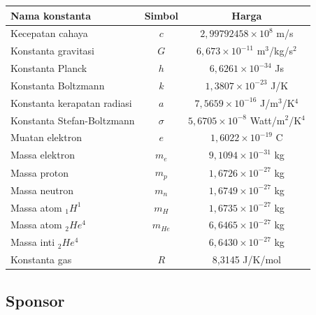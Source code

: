 \documentclass[11pt,fleqn, a4paper]{exam}
\begin{document}
\begin{table}[ht]
\centering
\label{tab:konstanta03}
\renewcommand{\arraystretch}{1.4}
\begin{tabular}{|l|c|c|}
\hline
\textbf{Nama konstanta} & \textbf{Simbol} & \textbf{Harga}\\
\hline
\hline
Kecepatan cahaya & $c$ & $2,99792458 \times 10^{8}$ m/s\\
\hline
Konstanta gravitasi & $G$ & $6,673 \times 10^{-11}$ m$^{3}$/kg/s$^{2}$\\
\hline
Konstanta Planck & $h$ & $6,6261 \times 10^{-34}$ Js\\
\hline
Konstanta Boltzmann & $k$ & $1,3807 \times 10^{-23}$ J/K\\
\hline
Konstanta kerapatan radiasi & $a$ & $7,5659 \times 10^{-16}$ J/m$^3$/K$^4$\\
\hline
Konstanta Stefan-Boltzmann & $\sigma$ & $5,6705 \times 10^{-8}$ Watt/m$^2$/K$^4$\\
\hline
Muatan elektron & $e$ & $1,6022 \times 10^{-19}$ C\\
\hline
Massa elektron & $m_e$ & $9,1094 \times 10^{-31}$ kg\\
\hline
Massa proton & $m_p$ & $1,6726 \times 10^{-27}$ kg\\
\hline
Massa neutron & $m_n$ & $1,6749 \times 10^{-27}$ kg\\
\hline
Massa atom $_{1}H^{1}$ & $m_H$ & $1,6735 \times 10^{-27}$ kg\\
\hline
Massa atom $_{2}He^{4}$ & $m_{He}$ & $6,6465 \times 10^{-27}$ kg\\
\hline
Massa inti $_{2}He^{4}$ &  & $6,6430 \times 10^{-27}$ kg\\
\hline
Konstanta gas & $R$ & 8,3145 J/K/mol\\
\hline
\end{tabular} 
\end{table}

\newpage
\begin{flushleft}
\section*{Sponsor}
\end{flushleft}
\end{document}
